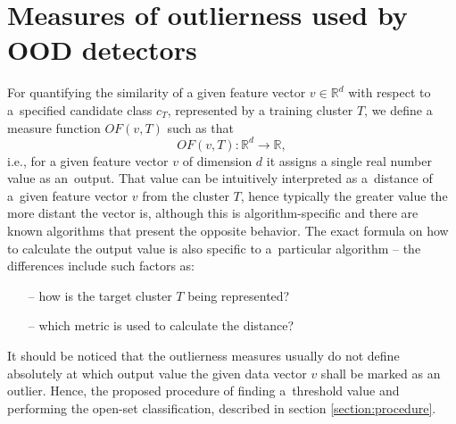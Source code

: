 \section{Measures of outlierness used by OOD detectors}
\label{section:measures}

For quantifying the similarity of a given feature vector $v \in \mathbb{R}^d$ with respect to a~specified candidate class $c_T$, represented by a training cluster $T$, we define a measure function $OF(v, T)$ such as that
\begin{equation}
    OF(v, T) : \mathbb{R}^d \rightarrow \mathbb{R},
\end{equation}
i.e., for a given feature vector $v$ of dimension $d$ it assigns a single real number value as an~output. That value can be intuitively interpreted as a~distance of a~given feature vector $v$ from the cluster $T$, hence typically the greater value the more distant the vector is, although this is algorithm-specific and there are known algorithms that present the opposite behavior. The exact formula on how to calculate the output value is also specific to a~particular algorithm – the differences include such factors as:
\begin{itemize}
    \item[–] how is the target cluster $T$ being represented?
    \item[–] which metric is used to calculate the distance?
\end{itemize}

It should be noticed that the outlierness measures usually do not define absolutely at which output value the given data vector $v$ shall be marked as an outlier. Hence, the proposed procedure of finding a~threshold value and performing the open-set classification, described in section \ref{section:procedure}.









